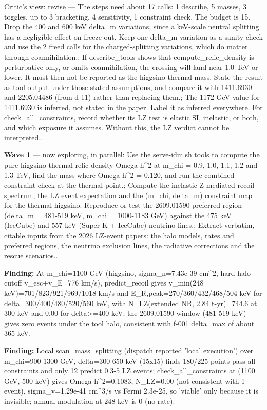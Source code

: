 \documentclass[11pt,a4paper]{article}
\begin{document}
\begin{enumerate}
Critic's view: revise --- The steps need about 17 calls: 1 describe, 5 masses, 3 toggles, up to 3 bracketing, 4 sensitivity, 1 constraint check. The budget is 15. Drop the 400 and 600 keV delta\_m variations, since a keV-scale neutral splitting has a negligible effect on freeze-out. Keep one delta\_m variation as a sanity check and use the 2 freed calls for the charged-splitting variations, which do matter through coannihilation.; If describe\_tools shows that compute\_relic\_density is perturbative only, or omits coannihilation, the crossing will land near 1.0 TeV or lower. It must then not be reported as the higgsino thermal mass. State the result as tool output under those stated assumptions, and compare it with 1411.6930 and 2205.04486 (from d-11) rather than replacing them.; The 1172 GeV value for 1411.6930 is inferred, not stated in the paper. Label it as inferred everywhere. For check\_all\_constraints, record whether its LZ test is elastic SI, inelastic, or both, and which exposure it assumes. Without this, the LZ verdict cannot be interpreted..

\end{enumerate}
\textbf{Wave 1} --- now exploring, in parallel: Use the serve-idm.sh tools to compute the pure-higgsino thermal relic density Omega h\textasciicircum{}2 at m\_chi = 0.9, 1.0, 1.1, 1.2 and 1.3 TeV, find the mass where Omega h\textasciicircum{}2 = 0.120, and run the combined constraint check at the thermal point.; Compute the inelastic Z-mediated recoil spectrum, the LZ event expectation and the (m\_chi, delta\_m) constraint map for the thermal higgsino. Reproduce or test the 2609.01590 preferred region (delta\_m = 481-519 keV, m\_chi = 1000-1183 GeV) against the 475 keV (IceCube) and 557 keV (Super-K + IceCube) neutrino lines.; Extract verbatim, citable inputs from the 2026 LZ-event papers: the halo models, rates and preferred regions, the neutrino exclusion lines, the radiative corrections and the rescue scenarios..

\textbf{Finding:} At m\_chi=1100 GeV (higgsino, sigma\_n=7.43e-39 cm\textasciicircum{}2, hard halo cutoff v\_esc+v\_E=776 km/s), predict\_recoil gives v\_min(248 keV)=701/823/921/969/1018 km/s and E\_R,peak=270/360/432/468/504 keV for delta=300/400/480/520/560 keV, with N\_LZ(extended NR, 2.84 t-yr)=744.6 at 300 keV and 0.00 for delta\textgreater{}=400 keV; the 2609.01590 window (481-519 keV) gives zero events under the tool halo, consistent with f-001 delta\_max of about 365 keV.

\textbf{Finding:} Local scan\_mass\_splitting (dispatch reported 'local execution') over m\_chi=900-1300 GeV, delta=300-650 keV (15x15) finds 180/225 points pass all constraints and only 12 predict 0.3-5 LZ events; check\_all\_constraints at (1100 GeV, 500 keV) gives Omega h\textasciicircum{}2=0.1083, N\_LZ=0.00 (not consistent with 1 event), sigma\_v=1.29e-41 cm\textasciicircum{}3/s vs Fermi 2.3e-25, so 'viable' only because it is invisible; annual modulation at 248 keV is 0 (no rate).
\end{document}
